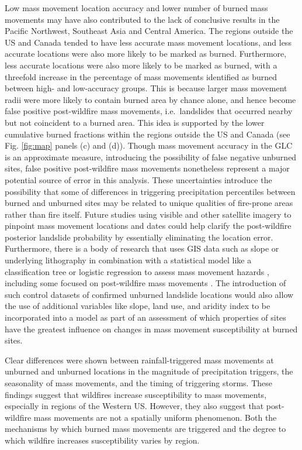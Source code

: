 \documentclass[nhess, manuscript]{copernicus}
\begin{document}
Low mass movement location accuracy and lower number of burned mass movements
may have also contributed to the lack of conclusive results in the
Pacific Northwest, Southeast Asia and Central America. The regions
outside the US and Canada tended to have less accurate mass movement locations, and
less accurate locations were also more likely to be marked as burned.
Furthermore, less accurate locations were also more likely to be marked as burned, with a threefold increase in the percentage of mass movements identified as burned between high- and low-accuracy groups.
This is because larger mass movement radii were more likely to contain
burned area by chance alone, and hence become false positive
post-wildfire mass movements, i.e.~landslides that occurred nearby but not
coincident to a burned area. This idea is supported by the lower
cumulative burned fractions within the regions outside the US and Canada (see
Fig. \ref{fig:map} panels (c) and (d)). Though mass movement accuracy in the GLC is an approximate measure, introducing the possibility of false negative unburned sites, false positive post-wildfire mass movements nonetheless represent a major potential source of error in this analysis. These uncertainties introduce the possibility that some of differences in triggering precipitation percentiles between burned and unburned sites may be related to unique qualities of fire-prone areas rather than fire itself.
Future studies
using visible and other satellite imagery to pinpoint mass movement
locations and dates could help clarify the post-wildfire posterior
landslide probability by essentially eliminating the location error.
Furthermore, there is a body of research that uses GIS data such as
slope or underlying lithography in combination with a statistical model
like a classification tree or logistic regression to assess mass movement
hazards \citep[e.g.][]{felicisimoMappingLandslideSusceptibility2013, leeApplicationVerificationFuzzy2007, ohlmacherUsingMultipleLogistic2003}, 
including some focused on post-wildfire mass movements 
\citep{cannonPredictingProbabilityVolume2010}. The introduction of 
such control datasets of confirmed unburned
landslide locations would also allow the use of additional variables
like slope, land use, and aridity index to be incorporated into a model
as part of an assessment of which properties of sites have the greatest
influence on changes in mass movement susceptibility at burned sites.


\conclusions

Clear differences were shown between rainfall-triggered mass movements at unburned and unburned locations in the magnitude of precipitation triggers, the seasonality of mass movements, and the timing of triggering storms. These findings suggest that wildfires increase susceptibility to mass movements, especially in regions of the Western US. However, they also suggest that post-wildfire mass movements are not a spatially uniform phenomenon. Both the mechanisms by which burned mass movements are triggered and the degree to which wildfire increases susceptibility varies by region. 
\end{document}
